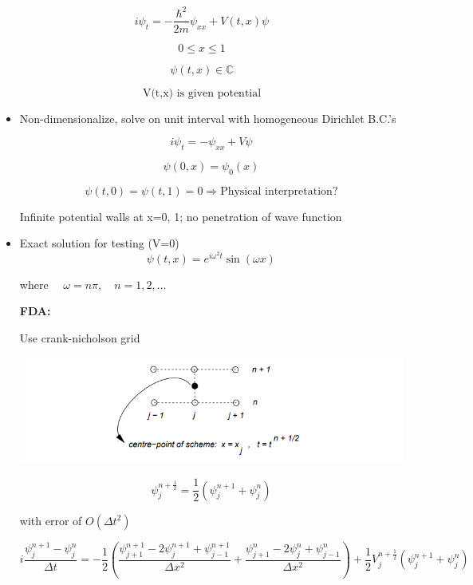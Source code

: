 \begin{equation}
    i \psi_t = - \frac{\hbar^2}{2m} \psi_{xx} + V(t,x) \psi
\end{equation}

\[ 0 \le x \le 1\]

\[ \psi(t,x) \in \mathbb{C}\]

\[ \text{V(t,x) is given potential} \]

\begin{itemize}
    \item Non-dimensionalize, solve on unit interval with homogeneous Dirichlet B.C.'s 

    \[ i \psi_t = - \psi_{xx} + V \psi \]

    

    \[ \psi(0,x) = \psi_0(x)\]

    \[ \psi(t,0) = \psi(t,1) = 0 \Rightarrow \text{Physical interpretation?}\]

    Infinite potential walls at x=0, 1; no penetration of wave function

    \item Exact solution for testing (V=0)
    \[ \psi(t,x) = e^{i\omega ^2 t } \sin(\omega x)\]

    where $\quad \omega = n \pi , \quad n=1,2,\ldots$

    \textbf{FDA:}

    Use crank-nicholson grid

    \includegraphics[width =  \linewidth]{Images/crank_nicholson_scheme.png}
    

    \[ \psi_j^{n+\frac{1}{2}} = \frac{1}{2} ( \psi^{n+1}_j + \psi_j^n)\]

    with error of $O(\Delta t^2)$


    \begin{equation}
        i \frac{\psi^{n+1}_j-\psi^n_j}{\Delta t} = -\frac{1}{2}\left( \frac{\psi^{n+1}_{j+1} - 2 \psi_j^{n+1} + \psi _ {j-1}^{n+1}}{\Delta x^2} + \frac{\psi_{j+1}^n-2\psi_j^n + \psi_{j-1}^n}{\Delta x^2}\right) + \frac{1}{2} V_j^{n+\frac{1}{2}} (\psi_j^{n+1}+\psi_j^n) 
    \end{equation}


\end{itemize}
